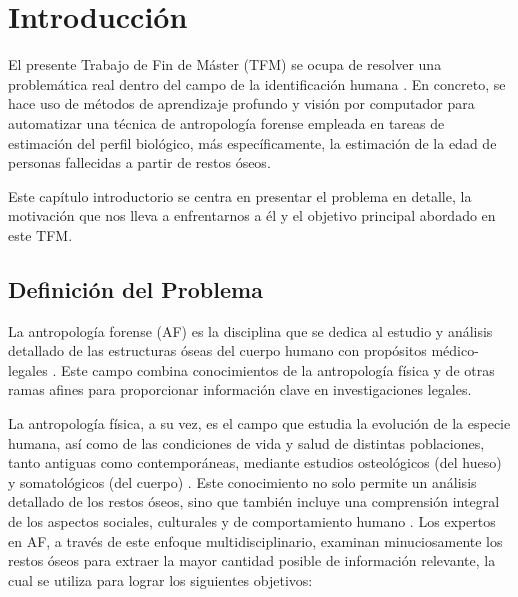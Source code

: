 \chapter{Introducción}
El presente Trabajo de Fin de Máster (TFM) se ocupa de resolver una problemática real dentro del campo de la identificación humana \cite{thompson_forensic_2006}. En concreto, se hace uso de métodos de aprendizaje profundo y visión por computador para automatizar una técnica de antropología forense empleada en tareas de estimación del perfil biológico, más específicamente, la estimación de la edad de personas fallecidas a partir de restos óseos. 

Este capítulo introductorio se centra en presentar el problema en detalle, la motivación que nos lleva a enfrentarnos a él y el objetivo principal abordado en este TFM. 


\section{Definición del Problema}
\label{daIntro_ProblemDef}
La antropología forense (AF) es la disciplina que se dedica al estudio y análisis detallado de las estructuras óseas del cuerpo humano con propósitos médico-legales \cite{byers_introduction_2016,RefWorks:RefID:17-christensen2019forensic}. Este campo combina conocimientos de la antropología física y de otras ramas afines para proporcionar información clave en investigaciones legales.

La antropología física, a su vez, es el campo que estudia la evolución de la especie humana, así como de las condiciones de vida y salud de distintas poblaciones, tanto antiguas como contemporáneas, mediante estudios osteológicos (del hueso) y somatológicos (del cuerpo) \cite{jurmain_introduction_2018}. Este conocimiento no solo permite un análisis detallado de los restos óseos, sino que también incluye una comprensión integral de los aspectos sociales, culturales y de comportamiento humano \cite{antrofisica}. Los expertos en AF, a través de este enfoque multidisciplinario, examinan minuciosamente los restos óseos para extraer la mayor cantidad posible de información relevante, la cual se utiliza para lograr los siguientes objetivos:

